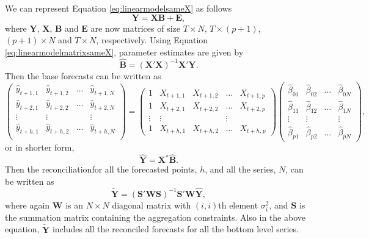 \documentclass[11pt,a4paper,]{article}
\begin{document}
We can represent Equation \eqref{eq:linearmodelsameX} as follows
\begin{equation}\label{eq:linearmodelmatrixsameX}
\bm{Y}= \bm{X} \bm{B} + \bm{E},
\end{equation}
where \(\bm{Y}\), \(\bm{X}\), \(\bm{B}\) and \(\bm{E}\) are now matrices of size \(T\times N\), \(T\times (p+1)\), \((p+1)\times N\) and \(T \times N\), respectively. Using Equation \eqref{eq:linearmodelmatrixsameX}, parameter estimates are given by
\begin{equation}
\hat{\bm{B}} = (\bm{X}'\bm{X})^{-1} \bm{X}'\bm{Y}.
\end{equation}
Then the base forecasts can be written as
\begin{equation}
\begin{pmatrix}
 \hat{y}_{t+1,1} & \hat{y}_{t+1,2} & \dots & \hat{y}_{t+1,N}\\
 \hat{y}_{t+2,1} & \hat{y}_{t+2,2} & \dots & \hat{y}_{t+2,N}\\
 \vdots & \vdots & & \vdots\\
 \hat{y}_{t+h,1} & \hat{y}_{t+h,2} & \dots & \hat{y}_{t+h,N}\\
 \end{pmatrix} =
 \begin{pmatrix}
 1 & X_{t+1,1} & X_{t+1,2} & \dots & X_{t+1,p}\\
 1 & X_{t+2,1} & X_{t+2,2} & \dots & X_{t+2,p}\\
 \vdots & \vdots & & \vdots\\
 1 & X_{t+h,1} & X_{t+h,2} & \dots & X_{t+h,p}
 \end{pmatrix}
 \begin{pmatrix}
 \hat\beta_{01} & \hat\beta_{02} & \dots & \hat\beta_{0N}\\
 \hat\beta_{11} & \hat\beta_{12} & \dots & \hat\beta_{1N}\\
 \vdots & \vdots & & \vdots\\
 \hat\beta_{p1} & \hat\beta_{p2} & \dots & \hat\beta_{pN}
 \end{pmatrix},
\end{equation}
or in shorter form,
\begin{equation}\label{eq:baseforecatssameX}
\hat{\bm{Y}} = \bm{X}^* \hat{\bm{B}}.
\end{equation}
Then the reconciliationfor all the forecasted points, \(h\), and all the series, \(N\), can be written as
\begin{equation}\label{eq:recforecastssameX}
\tilde{\bm{Y}} = (\bm{S}'\bm{W}\bm{S})^{-1}\bm{S}'\bm{W} \hat{\bm{Y}},
\end{equation}
where again \(\bm{W}\) is an \(N\times N\) diagonal matrix with \((i,i)\)th element \(\sigma_i^2\), and \(\bm{S}\) is the summation matrix containing the aggregation constraints. Also in the above equation, \(\tilde{\bm{Y}}\) includes all the reconciled forecasts for all the bottom level series.
\end{document}
